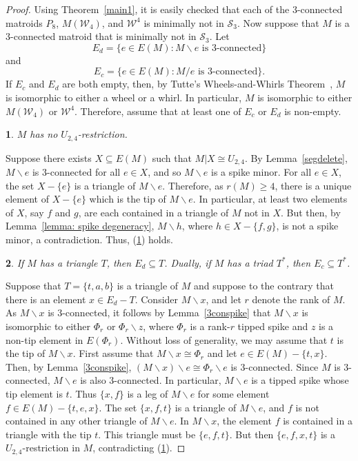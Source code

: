 \documentclass[11pt]{amsart}
\newtheorem{sublemma}{}[theorem]
\numberwithin{equation}{section} %
\newcommand{\cS}{\mathcal{S}}
\newcommand{\cW}{\mathcal{W}}
\begin{document}
\begin{proof}
Using Theorem~\ref{main1}, it is easily checked that each of the $3$-connected matroids $P_8$, $M(\cW_4)$, and $\cW^4$ is minimally not in $\cS_3$. Now suppose that $M$ is a $3$-connected matroid that is minimally not in $\cS_3$. Let
$$E_d=\{e\in E(M) : M\backslash e \text{ is $3$-connected} \}$$
and
$$E_c=\{e\in E(M) : M/ e \text{ is $3$-connected} \}.$$
If $E_c$ and $E_d$ are both empty, then, by Tutte's Wheels-and-Whirls Theorem~\cite{tut66}, $M$ is isomorphic to either a wheel or a whirl. In particular, $M$ is isomorphic to either $M(\cW_4)$ or $\cW^4$. Therefore, assume that at least one of $E_c$ or $E_d$ is non-empty.

\begin{sublemma}
\label{sublem: no 4pl}
$M$ has no $U_{2, 4}$-restriction.
\end{sublemma}

Suppose there exists $X \subseteq E(M)$ such that $M|X\cong U_{2, 4}$. By Lemma~\ref{segdelete}, $M\backslash e$ is $3$-connected for all $e\in X$, and so $M\backslash e$ is a spike minor. For all $e \in X$, the set $X - \{e\}$ is a triangle of $M \backslash e$. Therefore, as $r(M) \geq 4$, there is a unique element of $X-\{e\}$ which is the tip of $M\backslash e$. In particular, at least two elements of $X$, say $f$ and $g$, are each contained in a triangle of $M$ not in $X$. But then, by Lemma~\ref{lemma: spike degeneracy}, $M\backslash h$, where $h\in X-\{f, g\}$, is not a spike minor, a contradiction. Thus, (\ref{sublem: no 4pl}) holds.

\begin{sublemma}
\label{sublem: T,T*}
If $M$ has a triangle $T$, then $E_d\subseteq T$. Dually, if $M$ has a triad $T^*$, then $E_c\subseteq T^*$.
\end{sublemma}

Suppose that $T=\{t, a, b\}$ is a triangle of $M$ and suppose to the contrary that there is an element $x\in E_d-T$. Consider $M\backslash x$, and let $r$ denote the rank of $M$. As $M\backslash x$ is $3$-connected, it follows by Lemma~\ref{3conspike} that $M\backslash x$ is isomorphic to either $\Phi_r$ or $\Phi_r\backslash z$, where $\Phi_r$ is a rank-$r$ tipped spike and $z$ is a non-tip element in $E(\Phi_r)$. Without loss of generality, we may assume that $t$ is the tip of $M\backslash x$. First assume that $M\backslash x\cong \Phi_r$ and let $e\in E(M)-\{t, x\}$. Then, by Lemma~\ref{3conspike}, $(M\backslash x)\backslash e\cong \Phi_r\backslash e$ is $3$-connected. Since $M$ is $3$-connected, $M\backslash e$ is also $3$-connected. In particular, $M\backslash e$ is a tipped spike whose tip element is $t$. Thus $\{x, f\}$ is a leg of $M\backslash e$ for some element $f\in E(M)-\{t, e, x\}$. The set $\{x,f,t\}$ is a triangle of $M \backslash e$, and $f$ is not contained in any other triangle of $M \backslash e$. In $M \backslash x$, the element $f$ is contained in a triangle with the tip $t$. This triangle must be $\{e,f,t\}$. But then $\{e, f, x, t\}$ is a $U_{2, 4}$-restriction in $M$, contradicting (\ref{sublem: no 4pl}).


\end{proof}
\end{document}
